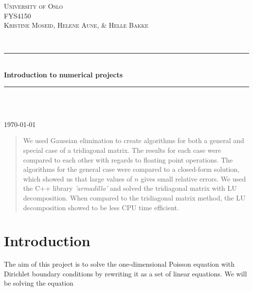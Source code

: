 \documentclass[12pt]{article}
\begin{document}
\begin{titlepage}

\newcommand{\HRule}{\rule{\linewidth}{0.5mm}}
\center

\textsc{\LARGE University of Oslo}\\[1.5cm]
\textsc{\Large FYS4150}\\[0.5cm]
\textsc{\large Kristine Moseid, Helene Aune, \& Helle Bakke}\\[0.5cm]

\begin{minipage}{0.4\textwidth}
\end{minipage}\\[1cm]

\HRule \\[0.4cm]
{ \huge \bfseries Introduction to numerical projects}\\[0.4cm]
\HRule \\[1.5cm]

\begin{minipage}{0.4\textwidth}
\end{minipage}\\[8cm]

{\large \today}\\[3cm]
\vfill

\end{titlepage}

\newpage
\tableofcontents

\newpage



\begin{abstract}
\noindent We used Gaussian elimination to create algorithms for both a general and special case of a tridiagonal matrix. The results for each case were compared to each other with regards to floating point operations. The algorithms for the general case were compared to a closed-form solution, which showed us that large values of $n$ gives small relative errors. We used the C++ library \textit{'armadillo'} and solved the tridiagonal matrix with LU decomposition. When compared to the tridiagonal matrix method, the LU decomposition showed to be less CPU time efficient.
\end{abstract}



\section{Introduction}

\noindent The aim of this project is to solve the one-dimensional Poisson equation with Dirichlet boundary conditions by rewriting it as a set of linear equations. We will be solving the equation
\end{document}
